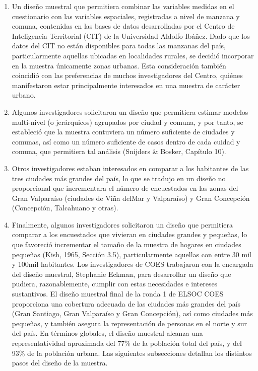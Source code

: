 \documentclass[
]{book}
\begin{document}
\begin{enumerate}
\def\labelenumi{\arabic{enumi}.}
\item
  Un diseño muestral que permitiera combinar las variables medidas en el
  cuestionario con las variables espaciales, registradas a nivel de
  manzana y comuna, contenidas en las bases de datos desarrolladas por
  el Centro de Inteligencia Territorial (CIT) de la Universidad Aldolfo
  Ibáñez. Dado que los datos del CIT no están disponibles para todas las
  manzanas del país, particularmente aquellas ubicadas en localidades
  rurales, se decidió incorporar en la muestra únicamente zonas urbanas.
  Esta consideración también coincidió con las preferencias de muchos
  investigadores del Centro, quiénes manifestaron estar principalmente
  interesados en una muestra de carácter urbano.
\item
  Algunos investigadores solicitaron un diseño que permitiera estimar
  modelos multi-nivel (o jerárquicos) agrupados por ciudad y comuna, y
  por tanto, se estableció que la muestra contuviera un número
  suficiente de ciudades y comunas, así como un número suficiente de
  casos dentro de cada cuidad y comuna, que permitiera tal análisis
  (Snijders \& Bosker, Capítulo 10).
\item
  Otros investigadores estaban interesados en comparar a los habitantes
  de las tres ciudades más grandes del país, lo que se tradujo en un
  diseño no proporcional que incrementara el número de encuestados en
  las zonas del Gran Valparaíso (ciudades de Viña delMar y Valparaíso) y
  Gran Concepción (Concepción, Talcahuano y otras).
\item
  Finalmente, algunos investigadores solicitaron un diseño que
  permitiera comparar a los encuestados que vivieran en ciudades grandes
  y pequeñas, lo que favoreció incrementar el tamaño de la muestra de
  hogares en ciudades pequeñas (Kish, 1965, Sección 3.5),
  particularmente aquellas con entre 30 mil y 100mil habitantes. Los
  investigadores de COES trabajaron con la encargada del diseño
  muestral, Stephanie Eckman, para desarrollar un diseño que pudiera,
  razonablemente, cumplir con estas necesidades e intereses sustantivos.
  El diseño muestral final de la ronda 1 de ELSOC COES proporciona una
  cobertura adecuada de las ciudades más grandes del país (Gran
  Santiago, Gran Valparaíso y Gran Concepción), así como ciudades más
  pequeñas, y también asegura la representación de personas en el norte
  y sur del país. En términos globales, el diseño muestral alcanza una
  representatividad aproximada del 77\% de la población total del país,
  y del 93\% de la población urbana. Las siguientes subsecciones
  detallan los distintos pasos del diseño de la muestra.
\end{enumerate}
\end{document}
